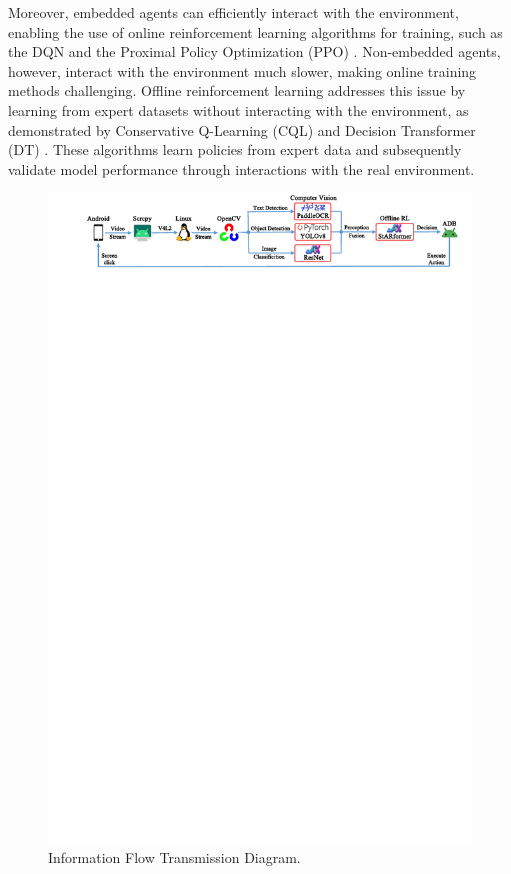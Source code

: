 \documentclass[runningheads]{llncs}
\newcounter{algorithm}
\begin{document}
Moreover, embedded agents can efficiently interact with the environment, enabling the use of online reinforcement learning algorithms for training,
such as the DQN \cite{DQN} and the Proximal Policy Optimization (PPO) \cite{PPO}. Non-embedded agents,
however, interact with the environment much slower, making online training methods challenging.
Offline reinforcement learning addresses this issue by learning from expert datasets without interacting with the environment,
as demonstrated by Conservative Q-Learning (CQL) \cite{CQL} and Decision Transformer (DT) \cite{DT}.
These algorithms learn policies from expert data and subsequently validate model performance through interactions with the real environment.

\begin{figure}[htbp]
  \centering
  \includegraphics[width=\textwidth]{figures/framework.pdf}
  \caption{Information Flow Transmission Diagram.}\label{fig-framework}
\end{figure}
\end{document}
